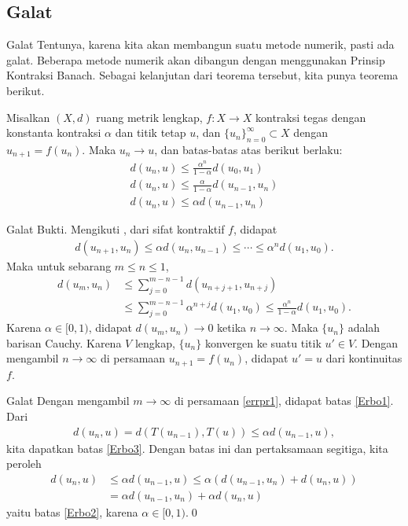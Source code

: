 \documentclass[xcolor={dvipsnames}, 9pt]{beamer}
\begin{document}
	\subsection{Galat}
	\begin{frame}{Galat}
		Tentunya, karena kita akan membangun suatu metode numerik, pasti ada galat. Beberapa metode numerik akan dibangun dengan menggunakan Prinsip Kontraksi Banach. Sebagai kelanjutan dari teorema tersebut, kita punya teorema berikut.
		\begin{theorem}
			Misalkan $(X,d)$ ruang metrik lengkap, $f:X\to X$ kontraksi tegas dengan konstanta kontraksi $\alpha$ dan titik tetap $u$, dan $\{u_n\}_{n=0}^\infty\subset X$ dengan $u_{n+1} = f(u_n)$. Maka $u_n\to u$, dan batas-batas atas berikut berlaku:
			\begin{align}
				d(u_n,u)\leq\frac{\alpha^n}{1-\alpha}d(u_0,u_1)\label{Erbo1} \\
				d(u_n,u)\leq\frac{\alpha}{1-\alpha}d(u_{n-1},u_n)\label{Erbo2} \\
				d(u_n,u)\leq\alpha d(u_{n-1},u_n)\label{Erbo3}
			\end{align}
		\end{theorem}
	\end{frame}
	\begin{frame}{Galat}
		Bukti. Mengikuti \cite{Han2009Theoretical}, dari sifat kontraktif $f$, didapat
		\begin{align*}
			d(u_{n+1},u_n)\leq\alpha d(u_n,u_{n-1})\leq\cdots\leq\alpha^nd(u_1,u_0).
		\end{align*}
		Maka untuk sebarang $m\leq n\leq 1$,
		\begin{align}
			d(u_m,u_n)&\leq\sum_{j=0}^{m-n-1}d(u_{n+j+1},u_{n+j}) \nonumber\\
			&\leq\sum_{j=0}^{m-n-1}\alpha^{n+j}d(u_1,u_0)\leq\frac{\alpha^n}{1-\alpha}d(u_1,u_0)\label{errpr1}.
		\end{align}
		Karena $\alpha\in[0,1)$, didapat $d(u_m,u_n)\to 0$ ketika $n\to\infty$. Maka $\{u_n\}$ adalah barisan Cauchy. Karena $V$ lengkap, $\{u_n\}$ konvergen ke suatu titik $u'\in V$. Dengan mengambil $n\to\infty$ di persamaan $u_{n+1}=f(u_n)$, didapat $u'=u$ dari kontinuitas $f$.
	\end{frame}
	\begin{frame}{Galat}
		Dengan mengambil $m\to\infty$ di persamaan \eqref{errpr1}, didapat batas \eqref{Erbo1}. \newline
		Dari
		\begin{align*}
			d(u_n,u) = d(T(u_{n-1}),T(u)) \leq \alpha d(u_{n-1},u),
		\end{align*}
		kita dapatkan batas \eqref{Erbo3}. Dengan batas ini dan pertaksamaan segitiga, kita peroleh
		\begin{align*}
			d(u_n,u)&\leq \alpha d(u_{n-1},u)\leq \alpha(d(u_{n-1},u_n)+d(u_n,u))\\
			&=\alpha d(u_{n-1},u_n)+\alpha d(u_n,u)
		\end{align*}
		yaitu batas \eqref{Erbo2}, karena $\alpha\in[0,1)$.\qed
	\end{frame}
\end{document}

